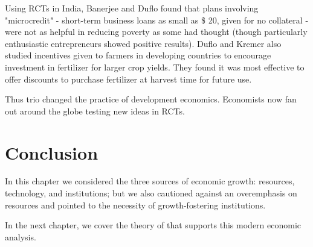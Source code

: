 \documentclass[11pt]{article} %
\begin{document}
Using RCTs in India, Banerjee and Duflo found that plans involving "microcredit" - short-term business loans as small as \$ 20, given for no collateral - were not as helpful in reducing poverty as some had thought (though particularly enthusiastic entrepreneurs showed positive results). Duflo and Kremer also studied incentives given to farmers in developing countries to encourage investment in fertilizer for larger crop yields. They found it was most effective to offer discounts to purchase fertilizer at harvest time for future use.

Thus trio changed the practice of development economics. Economists now fan out around the globe testing new ideas in RCTs.

\section*{Conclusion}
In this chapter we considered the three sources of economic growth: resources, technology, and institutions; but we also cautioned against an overemphasis on resources and pointed to the necessity of growth-fostering institutions.

In the next chapter, we cover the theory of that supports this modern economic analysis.
\end{document}

